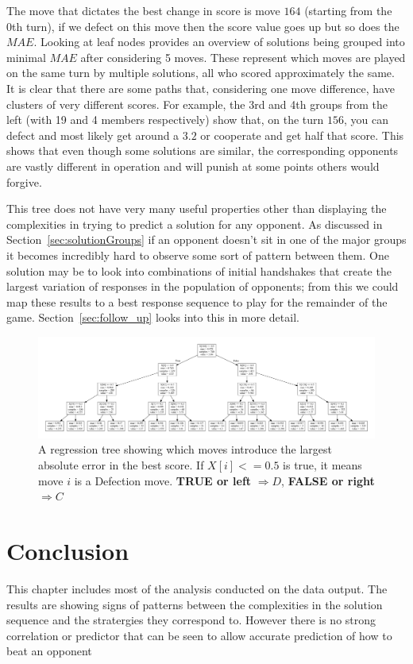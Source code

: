The move that dictates the best change in score is move $164$ (starting from the 0th turn), if we defect on this move then the score value goes up but so does the $MAE$.
Looking at leaf nodes provides an overview of solutions being grouped into minimal $MAE$ after considering 5 moves.
These represent which moves are played on the same turn by multiple solutions, all who scored approximately the same.
It is clear that there are some paths that, considering one move difference, have clusters of very different scores. 
For example, the 3rd and 4th groups from the left (with 19 and 4 members respectively) show that, on the turn $156$, you can defect and most likely get around a $3.2$ or cooperate and get half that score.
This shows that even though some solutions are similar, the corresponding opponents are vastly different in operation and will punish at some points others would forgive.

This tree does not have very many useful properties other than displaying the complexities in trying to predict a solution for any opponent.
As discussed in Section~\ref{sec:solutionGroups} if an opponent doesn't sit in one of the major groups it becomes incredibly hard to observe some sort of pattern between them.
One solution may be to look into combinations of initial handshakes that create the largest variation of responses in the population of opponents; from this we could map these results to a best response sequence to play for the remainder of the game.
Section~\ref{sec:follow_up} looks into this in more detail.

\begin{figure}
    \includegraphics[width=1.0\textwidth, center]{./img/descriptive/reg_tree.pdf}
    \centering
    \caption{A regression tree showing which moves introduce the largest absolute error in the best score. If $X[i]<=0.5$ is true, it means move $i$ is a Defection move.
    \textbf{TRUE or left} $\Rightarrow D$, \textbf{FALSE or right} $\Rightarrow C$}
    \label{fig:reg_tree}
\end{figure}


\section{Conclusion}
This chapter includes most of the analysis conducted on the data output.
The results are showing signs of patterns between the complexities in the solution sequence and the stratergies they correspond to.
However there is no strong correlation or predictor that can be seen to allow accurate prediction of how to beat an opponent

